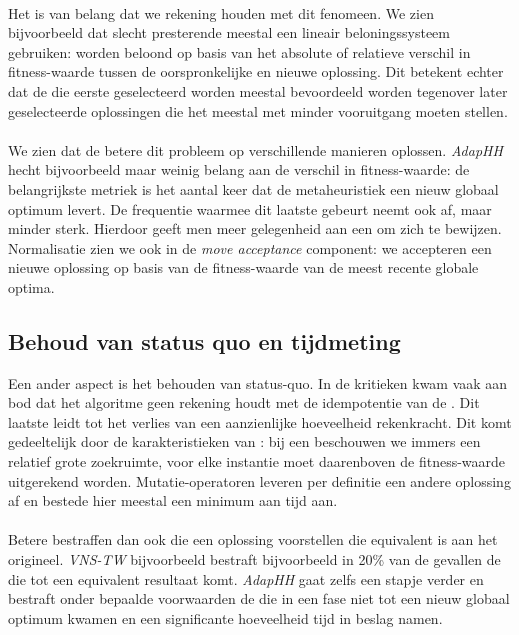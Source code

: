 \paragraph{}
Het is van belang dat we rekening houden met dit fenomeen. We zien bijvoorbeeld dat slecht presterende \abhhn{} meestal een lineair beloningssysteem gebruiken: \abhn{} worden beloond op basis van het absolute of relatieve verschil in fitness-waarde tussen de oorspronkelijke en nieuwe oplossing. Dit betekent echter dat de \abhn{} die eerste geselecteerd worden meestal bevoordeeld worden tegenover later geselecteerde oplossingen die het meestal met minder vooruitgang moeten stellen.
\paragraph{}
We zien dat de betere \abhhn{} dit probleem op verschillende manieren oplossen. \emph{AdapHH} hecht bijvoorbeeld maar weinig belang aan de verschil in fitness-waarde: de belangrijkste metriek is het aantal keer dat de metaheuristiek een nieuw globaal optimum levert. De frequentie waarmee dit laatste gebeurt neemt ook af, maar minder sterk. Hierdoor geeft men meer gelegenheid aan een \abh{} om zich te bewijzen. Normalisatie zien we ook in de \emph{move acceptance} component: we accepteren een nieuwe oplossing op basis van de fitness-waarde van de meest recente globale optima.

\subsection{Behoud van status quo en tijdmeting}
Een ander aspect is het behouden van status-quo. In de kritieken kwam vaak aan bod dat het algoritme geen rekening houdt met de idempotentie van de \abls{} \abhn{}. Dit laatste leidt tot het verlies van een aanzienlijke hoeveelheid rekenkracht. Dit komt gedeeltelijk door de karakteristieken van \abls{}: bij een \abls{} \abh{} beschouwen we immers een relatief grote zoekruimte, voor elke instantie moet daarenboven de fitness-waarde uitgerekend worden. Mutatie-operatoren leveren per definitie een andere oplossing af en bestede hier meestal een minimum aan tijd aan.
\paragraph{}
Betere \abhhn{} bestraffen dan ook \abhn{} die een oplossing voorstellen die equivalent is aan het origineel. \emph{VNS-TW} bijvoorbeeld bestraft bijvoorbeeld in 20\% van de gevallen de \abh{} die tot een equivalent resultaat komt. \emph{AdapHH} gaat zelfs een stapje verder en bestraft onder bepaalde voorwaarden de \abhn{} die in een fase niet tot een nieuw globaal optimum kwamen en een significante hoeveelheid tijd in beslag namen.


